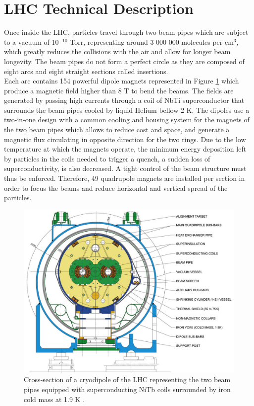  \section{LHC Technical Description}

    Once inside the LHC, particles travel through two beam pipes which are subject to a vacuum of 10$^{-10}$ Torr, representing around 3 000 000 molecules per cm$^3$, which greatly reduces the collisions with the air and allow for longer beam longevity. The beam pipes do not form a perfect circle as they are composed of eight arcs and eight straight sections called insertions. \\

    Each arc contains 154 powerful dipole magnets represented in Figure \ref{fig:I-2-magnet} which produce a magnetic field higher than 8 T to bend the beams. The fields are generated by passing high currents through a coil of NbTi superconductor that surrounds the beam pipes cooled by liquid Helium bellow 2 K. The dipoles use a two-in-one design with a common cooling and housing system for the magnets of the two beam pipes which allows to reduce cost and space, and generate a magnetic flux circulating in opposite direction for the two rings. Due to the low temperature at which the magnets operate, the minimum energy deposition left by particles in the coils needed to trigger a quench, a sudden loss of superconductivity, is also decreased. A tight control of the beam structure must thus be enforced. Therefore, 49 quadrupole magnets are installed per section in order to focus the beams and reduce horizontal and vertical spread of the particles. \\

    \begin{figure}[h!]
			\centering
			\includegraphics[width=\textwidth]{img/I-2-LHC/magnet.jpg}
			\caption{Cross-section of a cryodipole of the LHC representing the two beam pipes equipped with superconducting NiTb coils surrounded by iron cold mass at 1.9 K \cite{Evans:2008zzb}.}
			\label{fig:I-2-magnet}
		\end{figure}

